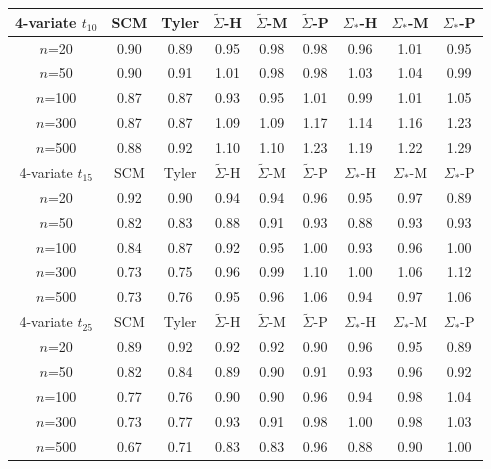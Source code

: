\begin{table}[t]
\begin{center}
\begin{scriptsize}
\begin{tabular}{c|cc|ccc|ccc}
    4-variate $t_{10}$ & SCM  & Tyler & $\tilde{\Sigma}$-H & $\tilde{\Sigma}$-M & $\tilde{\Sigma}$-P & ${\Sigma}_{*}$-H & ${\Sigma}_{*}$-M & ${\Sigma}_{*}$-P \\ \hline
    $n$=20             & 0.90 & 0.89  & 0.95   & 0.98   & 0.98  & 0.96    & 1.01    & 0.95   \\
    $n$=50             & 0.90 & 0.91  & 1.01   & 0.98   & 0.98  & 1.03    & 1.04    & 0.99   \\
    $n$=100            & 0.87 & 0.87  & 0.93   & 0.95   & 1.01  & 0.99    & 1.01    & 1.05   \\
    $n$=300            & 0.87 & 0.87  & 1.09   & 1.09   & 1.17  & 1.14    & 1.16    & 1.23   \\
    $n$=500            & 0.88 & 0.92  & 1.10   & 1.10   & 1.23  & 1.19    & 1.22    & 1.29   \\ \hline
    4-variate $t_{15}$  & SCM  & Tyler & $\tilde{\Sigma}$-H & $\tilde{\Sigma}$-M & $\tilde{\Sigma}$-P & ${\Sigma}_{*}$-H & ${\Sigma}_{*}$-M & ${\Sigma}_{*}$-P \\ \hline
    $n$=20             & 0.92 & 0.90  & 0.94   & 0.94   & 0.96  & 0.95    & 0.97    & 0.89   \\
    $n$=50             & 0.82 & 0.83  & 0.88   & 0.91   & 0.93  & 0.88    & 0.93    & 0.93   \\
    $n$=100            & 0.84 & 0.87  & 0.92   & 0.95   & 1.00  & 0.93    & 0.96    & 1.00   \\
    $n$=300            & 0.73 & 0.75  & 0.96   & 0.99   & 1.10  & 1.00    & 1.06    & 1.12   \\
    $n$=500            & 0.73 & 0.76  & 0.95   & 0.96   & 1.06  & 0.94    & 0.97    & 1.06   \\ \hline
    4-variate $t_{25}$  & SCM  & Tyler & $\tilde{\Sigma}$-H & $\tilde{\Sigma}$-M & $\tilde{\Sigma}$-P & ${\Sigma}_{*}$-H & ${\Sigma}_{*}$-M & ${\Sigma}_{*}$-P \\ \hline
    $n$=20             & 0.89 & 0.92  & 0.92   & 0.92   & 0.90  & 0.96    & 0.95    & 0.89   \\
    $n$=50             & 0.82 & 0.84  & 0.89   & 0.90   & 0.91  & 0.93    & 0.96    & 0.92   \\
    $n$=100            & 0.77 & 0.76  & 0.90   & 0.90   & 0.96  & 0.94    & 0.98    & 1.04   \\
    $n$=300            & 0.73 & 0.77  & 0.93   & 0.91   & 0.98  & 1.00    & 0.98    & 1.03   \\
    $n$=500            & 0.67 & 0.71  & 0.83   & 0.83   & 0.96  & 0.88    & 0.90    & 1.00   \\ \hline

\end{tabular}
\end{scriptsize}
\end{center}
\end{table}
